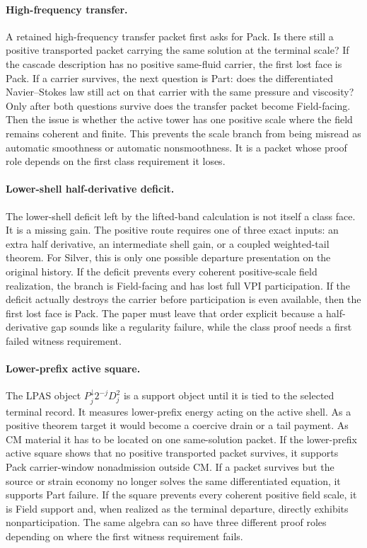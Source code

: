 \paragraph{High-frequency transfer.}
A retained high-frequency transfer packet first asks for Pack.
Is there still a positive transported packet carrying the same solution at the
terminal scale?
If the cascade description has no positive same-fluid carrier, the first lost
face is Pack.
If a carrier survives, the next question is Part: does the differentiated
Navier--Stokes law still act on that carrier with the same pressure and
viscosity?
Only after both questions survive does the transfer packet become Field-facing.
Then the issue is whether the active tower has one positive scale where the
field remains coherent and finite.
This prevents the scale branch from being misread as automatic smoothness or
automatic nonsmoothness.
It is a packet whose proof role depends on the first class requirement it
loses.

\paragraph{Lower-shell half-derivative deficit.}
The lower-shell deficit left by the lifted-band calculation is not itself a
class face.
It is a missing gain.
The positive route requires one of three exact inputs: an extra half derivative,
an intermediate shell gain, or a coupled weighted-tail theorem.
For Silver, this is only one possible departure presentation on the original
history.  If the deficit prevents every coherent positive-scale field
realization, the branch is Field-facing and has lost full VPI participation.
If the deficit actually destroys the carrier before participation is even
available, then the first lost face is Pack.
The paper must leave that order explicit because a half-derivative gap sounds
like a regularity failure, while the class proof needs a first failed witness
requirement.

\paragraph{Lower-prefix active square.}
The LPAS object \(P_j^\downarrow2^{-j}D_j^2\) is a support object until it is
tied to the selected terminal record.
It measures lower-prefix energy acting on the active shell.
As a positive theorem target it would become a coercive drain or a tail
payment.
As CM material it has to be located on one same-solution packet.
If the lower-prefix active square shows that no positive transported packet
survives, it supports Pack carrier-window nonadmission outside CM.
If a packet survives but the source or strain economy no longer solves the same
differentiated equation, it supports Part failure.
If the square prevents every coherent positive field scale, it is Field
support and, when realized as the terminal departure, directly exhibits
nonparticipation.
The same algebra can so have three different proof roles depending on
where the first witness requirement fails.

